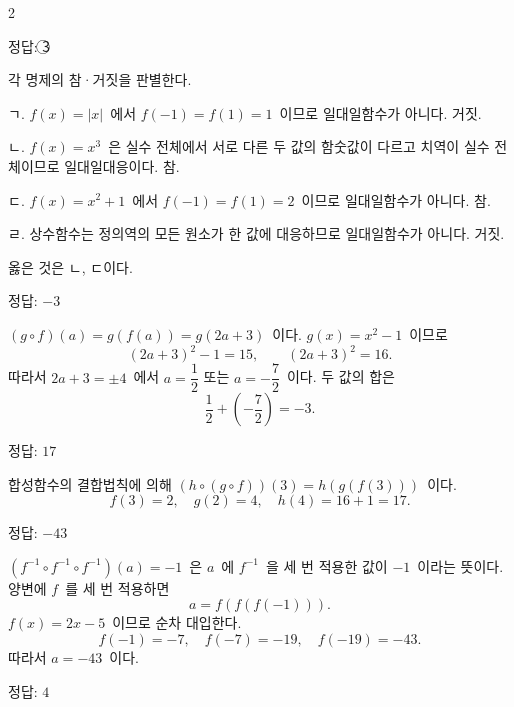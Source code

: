 \documentclass[10pt,fleqn]{article}
\begin{document}
\begin{multicols*}{2}
\begin{dmanswerbox}
정답: \textcircled{\scriptsize 3}
\end{dmanswerbox}

각 명제의 참·거짓을 판별한다.

\vspace{3mm}
ㄱ. $f(x) = |x|$\ 에서 $f(-1) = f(1) = 1$\ 이므로 일대일함수가 아니다. 거짓.

\vspace{3mm}
ㄴ. $f(x) = x^{3}$\ 은 실수 전체에서 서로 다른 두 값의 함숫값이 다르고 치역이 실수 전체이므로 일대일대응이다. 참.

\vspace{3mm}
ㄷ. $f(x) = x^{2} + 1$\ 에서 $f(-1) = f(1) = 2$\ 이므로 일대일함수가 아니다. 참.

\vspace{3mm}
ㄹ. 상수함수는 정의역의 모든 원소가 한 값에 대응하므로 일대일함수가 아니다. 거짓.

\vspace{3mm}
옳은 것은 ㄴ, ㄷ이다.

\begin{dmanswerbox}
정답: $-3$
\end{dmanswerbox}

$(g \circ f)(a) = g(f(a)) = g(2a + 3)$\ 이다. $g(x) = x^{2} - 1$\ 이므로
\[ (2a + 3)^{2} - 1 = 15,\qquad (2a + 3)^{2} = 16. \]
따라서 $2a + 3 = \pm 4$\ 에서 $a = \dfrac{1}{2}$ 또는 $a = -\dfrac{7}{2}$\ 이다. 두 값의 합은
\[ \dfrac{1}{2} + \left(-\dfrac{7}{2}\right) = -3. \]

\begin{dmanswerbox}
정답: $17$
\end{dmanswerbox}

합성함수의 결합법칙에 의해 $(h \circ (g \circ f))(3) = h(g(f(3)))$\ 이다.
\[ f(3) = 2,\quad g(2) = 4,\quad h(4) = 16 + 1 = 17. \]

\begin{dmanswerbox}
정답: $-43$
\end{dmanswerbox}

$(f^{-1} \circ f^{-1} \circ f^{-1})(a) = -1$\ 은 $a$\ 에 $f^{-1}$\ 을 세 번 적용한 값이 $-1$\ 이라는 뜻이다. 양변에 $f$\ 를 세 번 적용하면
\[ a = f(f(f(-1))). \]
$f(x) = 2x - 5$\ 이므로 순차 대입한다.
\[ f(-1) = -7,\quad f(-7) = -19,\quad f(-19) = -43. \]
따라서 $a = -43$\ 이다.
\begin{dmanswerbox}
정답: $4$
\end{dmanswerbox}


\end{multicols*}
\end{document}
